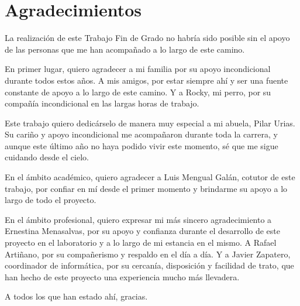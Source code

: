\chapter*{Agradecimientos}

La realización de este Trabajo Fin de Grado no habría sido posible sin el apoyo de las personas que me han acompañado a lo largo de este camino.

En primer lugar, quiero agradecer a mi familia por su apoyo incondicional durante todos estos años. A mis amigos, por estar siempre ahí y ser una fuente constante de apoyo a lo largo de este camino. Y a Rocky, mi perro, por su compañía incondicional en las largas horas de trabajo.

Este trabajo quiero dedicárselo de manera muy especial a mi abuela, Pilar Urias. Su cariño y apoyo incondicional me acompañaron durante toda la carrera, y aunque este último año no haya podido vivir este momento, sé que me sigue cuidando desde el cielo.

En el ámbito académico, quiero agradecer a Luis Mengual Galán, cotutor de este trabajo, por confiar en mí desde el primer momento y brindarme su apoyo a lo largo de todo el proyecto.

En el ámbito profesional, quiero expresar mi más sincero agradecimiento a Ernestina Menasalvas, por su apoyo y confianza durante el desarrollo de este proyecto en el laboratorio y a lo largo de mi estancia en el mismo. A Rafael Artiñano, por su compañerismo y respaldo en el día a día. Y a Javier Zapatero, coordinador de informática, por su cercanía, disposición y facilidad de trato, que han hecho de este proyecto una experiencia mucho más llevadera.

A todos los que han estado ahí, gracias.
